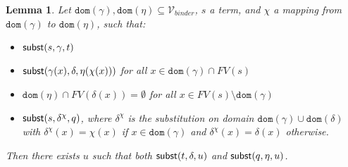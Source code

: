 \documentclass{lmcs}
\theoremstyle{theorem}\newtheorem{theorem}{Theorem}
\theoremstyle{theorem}\newtheorem{lemma}[theorem]{Lemma}
\theoremstyle{theorem}\newtheorem{corollary}[theorem]{Corollary}
\theoremstyle{definition}\newtheorem{definition}[theorem]{Definition}
\theoremstyle{definition}\newtheorem{example}[theorem]{Example}
\newcommand{\Vbound}{\mathcal{V}_{\mathit{binder}}}
\newcommand{\FV}{\mathit{FV}}
\newcommand{\domain}{\mathtt{dom}}
\newcommand{\avar}{x}
\begin{document}
\begin{lemma}\label{lem:combinesubst:gammabound}
Let $\domain(\gamma),\domain(\eta) \subseteq \Vbound$,
$s$ a term, and $\chi$ a mapping from $\domain(\gamma)$ to $\domain(\eta)$, such that:
\begin{itemize}
\item $\mathsf{subst}(s,\gamma,t)$
\item $\subrel{\gamma(\avar),\delta,\eta(\chi(\avar))}$ for all $\avar \in \domain(\gamma) \cap
  \FV(s)$
\item $\domain(\eta) \cap \FV(\delta(\avar)) = \emptyset$ for all $\avar \in \FV(s) \setminus
  \domain(\gamma)$
\item $\mathsf{subst}(s,\delta^\chi,q)$, where $\delta^\chi$ is the substitution on domain
  $\domain(\gamma) \cup \domain(\delta)$ with
  $\delta^\chi(\avar) = \chi(\avar)$ if $\avar \in \domain(\gamma)$ and $\delta^\chi(\avar) =
  \delta(\avar)$ otherwise.
\end{itemize}
Then there exists $u$ such that both $\mathsf{subst}(t,\delta,u)$ and $\mathsf{subst}(q,\eta,u)$.
\end{lemma}
\end{document}
